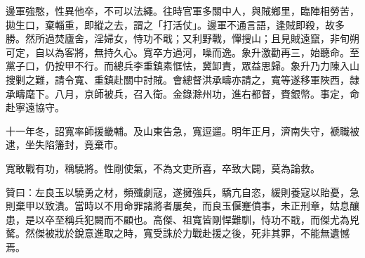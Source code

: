 \begin{pinyinscope}
邊軍強憨，性異他卒，不可以法繩。往時官軍多關中人，與賊鄉里，臨陣相勞苦，拋生口，棄輜重，即縱之去，謂之「打活仗」。邊軍不通言語，逢賊即殺，故多勝。然所過焚廬舍，淫婦女，恃功不戢；又利野戰，憚搜山；且見賊遠竄，非旬朔可定，自以為客將，無持久心。寬卒方過河，噪而逸。象升激勸再三，始聽命。至黨子口，仍按甲不行。而總兵李重鎮素恇怯，冀卸責，眾益思歸。象升乃力陳入山搜剿之難，請令寬、重鎮赴關中討賊。會總督洪承疇亦請之，寬等遂移軍陜西，隸承疇麾下。八月，京師被兵，召入衛。金錄滁州功，進右都督，賚銀幣。事定，命赴寧遠協守。

十一年冬，詔寬率師援畿輔。及山東告急，寬逗遛。明年正月，濟南失守，褫職被逮，坐失陷籓封，竟棄市。

寬敢戰有功，稱驍將。性剛使氣，不為文吏所喜，卒致大闢，莫為論救。

贊曰：左良玉以驍勇之材，頻殲劇寇，遂擁強兵，驕亢自恣，緩則養寇以貽憂，急則棄甲以致潰。當時以不用命罪諸將者屢矣，而良玉偃蹇僨事，未正刑章，姑息釀患，是以卒至稱兵犯闕而不顧也。高傑、祖寬皆剛悍難馴，恃功不戢，而傑尤為兇驁。然傑被戕於銳意進取之時，寬受誅於力戰赴援之後，死非其罪，不能無遺憾焉。


\end{pinyinscope}